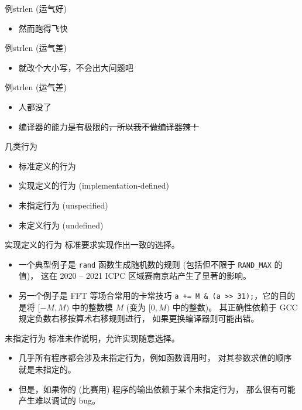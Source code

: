 \documentclass[10pt,mathserif]{beamer}
\newcommand{\lstcode}[1] {  }
\newcommand{\lstterm}[1] {  }
\begin{document}
\begin{frame}{例}{strlen (运气好)}
	\lstterm{strlen-1.out}
	\begin{itemize}
		\item 然而跑得飞快
	\end{itemize}
\end{frame}

\begin{frame}{例}{strlen (运气差)}
	\lstcode{strlen-2.cc}
	\begin{itemize}
		\item 就改个大小写，不会出大问题吧
	\end{itemize}
\end{frame}

\begin{frame}{例}{strlen (运气差)}
	\lstterm{strlen-2.out}
	\begin{itemize}
		\item 人都没了
		\item 编译器的能力是有极限的\sout{，所以我不做编译器辣！}
	\end{itemize}
\end{frame}

\begin{frame}{几类行为}
	\begin{itemize}
		\item 标准定义的行为
		\item 实现定义的行为 (implementation-defined)
		\item 未指定行为 (unspecified)
		\item 未定义行为 (undefined)
	\end{itemize}
\end{frame}

\begin{frame}{实现定义的行为}
	标准要求实现作出一致的选择。
	\begin{itemize}
		\item 一个典型例子是 \lstinline{rand} 函数生成随机数的规则
			(包括但不限于 \lstinline{RAND_MAX} 的值)，
			这在 2020 -- 2021 ICPC 区域赛南京站产生了显著的影响。
		\item 另一个例子是 FFT 等场合常用的卡常技巧
			\lstinline{a += M & (a >> 31);}，它的目的是将
			$[-M, M)$ 中的整数模 $M$ (变为 $[0, M)$ 中的整数)。
			其正确性依赖于 GCC 规定负数右移按算术右移规则进行，
			如果更换编译器则可能出错。
	\end{itemize}
\end{frame}

\begin{frame}{未指定行为}
	标准未作说明，允许实现随意选择。
	\begin{itemize}
		\item 几乎所有程序都会涉及未指定行为，例如函数调用时，
			对其参数求值的顺序就是未指定的。
		\item 但是，如果你的 (比赛用) 程序的输出依赖于某个未指定行为，
			那么很有可能产生难以调试的 bug。
	\end{itemize}
\end{frame}
\end{document}
